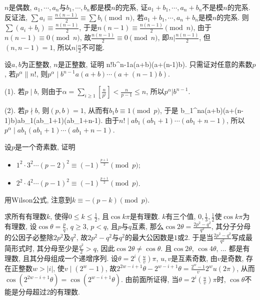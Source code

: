 \bq{}{}
$n$是偶数, $a_1, \cdots, a_n$与$b_1,\cdots, b_n$都是模$n$的完系, 证$a_1+b_1,\cdots, a_n+b_n$不是模$n$的完系.
\eq
\ba
反证法, $\sum a_i\equiv\frac{n(n-1)}{2}\equiv\sum b_i\pmod{n}$, 若$a_1+b_1,\cdots, a_n+b_n$是模$n$的完系.
则$\sum (a_i+b_i)\equiv\frac{n(n-1)}{2}$, 于是$n(n-1)\equiv\frac{n(n-1)}{2}\pmod{n}$, 由于$n(n-1)\equiv0\pmod{n}$,
故$\frac{n(n-1)}{2}\equiv0\pmod{n}$, 即$n\vert\frac{n(n-1)}{2}$, 但$(n,n-1)=1$, 所以$n\lvert\frac{n}{2}$不可能.
\ea

\bq{}{}
设$a,b$为正整数, $n$是正整数, 证明
\bee
n!\mid b^{n-1}a(a+b)\cdots(a+(n-1)b).
\eee
\eq
\ba
只需证对任意的素数$p$, 若$p^{\alpha}\| n!$, 则$p^{\alpha}\mid b^{n-1}a(a+b)\cdots(a+(n-1)b)$.

(1). 若$p\mid b$, 则由于$\alpha=\sum_{i\ge1}\left[\frac{n}{p^i}\right]<\frac{n}{p-1}\le n$, 所以$p^{\alpha}|b^{n-1}$.

(2). 若$p\nmid b$, 则$(p,b)=1$,  从而有$b_1b\equiv 1\pmod{p}$, 于是
\bee
b_{1}^{n}a(a+b)\cdots(a+(n-1)b)\equiv ab_1(ab_1+1)\cdots(ab_1+n-1).
\eee
由于$n!\mid ab_1(ab_1+1)\cdots(ab_1+n-1)$, 所以$p^{\alpha}\mid ab_1(ab_1+1)\cdots(ab_1+n-1)$.
\ea

\bq{}{}
设$p$是一个奇素数, 证明
\begin{itemize}
 \item $1^2\cdot3^2\cdots(p-2)^2\equiv(-1)^{\frac{p+1}{2}}\pmod{p}$;
 \item $2^2\cdot4^2\cdots(p-1)^2\equiv(-1)^{\frac{p+1}{2}}\pmod{p}$.
\end{itemize}
\eq
\ba
用Wilson公式, 注意到$k\equiv -(p-k)\pmod{p}$.
\ea

\bq{}{}
求所有有理数$k$, 使得$0\le k\le\frac{1}{2}$, 且$\cos k\pi$是有理数.
\eq
\ba
$k$有三个值, $0,\frac{1}{3},\frac{1}{2}$使$\cos k\pi$为有理数, 设$\cos\theta=\frac{p}{q}$,
$q\ge3$, $p<q$, 且$p$与$q$互素, 那么$\cos2\theta=\frac{2p^{2}-q^{2}}{q^{2}}$,
其分子分母的公因子必整除$2p^{2}$及$q^{2}$, 故$2p^{2}-q^{2}$与$q^{2}$的最大公因数是$1$或$2$.
于是当$\frac{2p^{2}-q^{2}}{q^{2}}$写成最简形式时, 其分母至少是$\frac{q^{2}}{2}>q$,
因此$\cos2\theta\ne\cos\theta$. 且$\cos2\theta$, $\cos4\theta$, ...
都是有理数, 且其分母组成一个递增序列. 设$\theta=2^{i}\left(\frac{u}{v}\right)\pi$,
$u,v$是互素奇数, 由$v$是奇数, 存在正整数$w>\left|i\right|$, 使$v\mid\left(2^{w}-1\right)$,
故$2^{2w-i+1}\theta-2^{w-i+1}\theta=\frac{2^{w}-1}{v}2^{w}u\left(2\pi\right)$,
从而$\cos\left(2^{2w-i+1}\theta\right)=\cos\left(2^{w-i+1}\theta\right)$.
由前面所证得, 当$\theta=2^{i}\left(\frac{u}{v}\right)\pi$时, $\cos\theta$不能是分母超过$2$的有理数.
\ea

